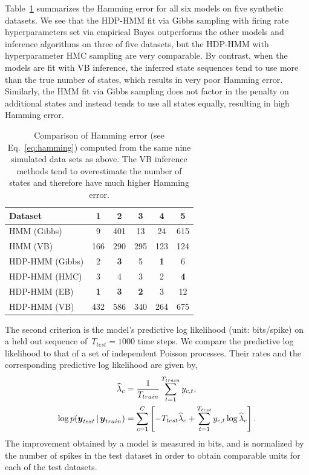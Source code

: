 Table~\ref{tab:synth_hamming} summarizes the Hamming error for all six models on five synthetic datasets. We see that the HDP-HMM fit via Gibbs sampling with firing rate hyperparameters set via empirical Bayes outperforms the other models and inference algorithms on three of five datasets, but the HDP-HMM with hyperparameter HMC sampling are very comparable. By contrast, when the models are fit with VB inference, the inferred state sequences tend to use more than the true number of states, which results in very poor Hamming error. Similarly, the HMM fit via Gibbs sampling does not factor in the penalty on additional states and instead tends to use all states equally, resulting in high Hamming error.

\begin{table}
\centering
\caption{Comparison of Hamming error (see Eq.~\ref{eq:hamming})  computed from the same nine simulated data sets as above. The VB inference methods tend to overestimate the number of states and therefore have much higher Hamming error.}
\begin{tabular}{l|ccccc}
Dataset & 1 & 2 & 3 & 4 & 5 \\
\hline
HMM (Gibbs) & 9 & 401 & 13 & 24 & 615 \\
HMM (VB) & 166 & 290 & 295 & 123 & 124 \\
HDP-HMM (Gibbs) & 2 & \bf{3} & 5 & \bf{1} & 6 \\
HDP-HMM (HMC) & 3 & 4 & 3 & 2 & \bf{4} \\
HDP-HMM (EB) & \bf{1} & \bf{3} & \bf{2} & 3 & 12 \\ 
HDP-HMM (VB) & 432 & 586 & 340 & 264 & 675 \\
\hline
\end{tabular}
\label{tab:synth_hamming}
\end{table}

The second criterion is the model's predictive log likelihood (unit: bits/spike) on a held out sequence of~${T_{test}=1000}$ time steps. We compare the predictive log likelihood to that of a set of independent Poisson processes. Their rates and the corresponding predictive log likelihood are given by,
\begin{align}
\widehat{\lambda}_c&=\frac{1}{T_{train}}\sum_{t=1}^{T_{train}} y_{c,t}, \\
\log p(\boldsymbol{y}_{test} \,|\, \boldsymbol{y}_{train}) &= \sum_{c=1}^C \left[ -T_{test} \widehat{\lambda}_c + \sum_{t=1}^{T_{test}} y_{c,t} \log \widehat{\lambda}_c  \right].
\end{align}
The improvement obtained by a model is measured in bits, and is normalized by the number of spikes in the test dataset in order to obtain comparable units for each of the test datasets.

